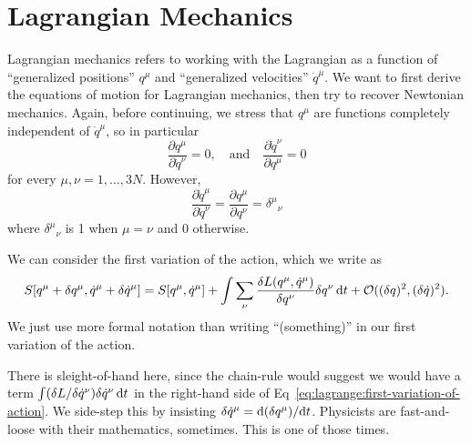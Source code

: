 \section{Lagrangian Mechanics}

\M
Lagrangian mechanics refers to working with the Lagrangian as a function
of ``generalized positions'' $q^{\mu}$ and ``generalized velocities'' $\dot{q}^{\mu}$.
We want to first derive the equations of motion for Lagrangian
mechanics, then try to recover Newtonian mechanics. Again, before
continuing, we stress that $q^{\mu}$ are functions completely
independent of $\dot{q}^{\mu}$, so in particular
\begin{equation}
\frac{\partial q^{\mu}}{\partial\dot{q}^{\nu}}=0,\quad\mbox{and}\quad
\frac{\partial\dot{q}^{\nu}}{\partial q^{\mu}}=0
\end{equation}
for every $\mu,\nu=1,\dots,3N$. However,
\begin{equation}
\frac{\partial\dot{q}^{\mu}}{\partial\dot{q}^{\nu}}=
\frac{\partial q^{\mu}}{\partial q^{\nu}}={\delta^{\mu}}_{\nu}
\end{equation}
where ${\delta^{\mu}}_{\nu}$ is 1 when $\mu=\nu$ and 0 otherwise.

We can consider the first variation of the action, which we write as
\begin{equation}\label{eq:lagrange:first-variation-of-action}
  S[q^{\mu} + \delta q^{\mu}, \dot{q}^{\mu} + \delta\dot{q}^{\mu}]
  =
  S[q^{\mu}, \dot{q}^{\mu}] + \int\sum_{\nu}\frac{\delta L(q^{\mu},
    \dot{q}^{\mu})}{\delta q^{\nu}}\delta q^{\nu}\,\mathrm{d} t +
  \mathcal{O}((\delta q)^{2},(\delta\dot{q})^{2}).
\end{equation}
We just use more formal notation than writing ``(something)'' in our
first variation of the action.

\begin{ddanger}
There is sleight-of-hand here, since the chain-rule would suggest we
would have a term $\int (\delta L/\delta\dot{q}^{\nu})\delta\dot{q}^{\nu}\,\mathrm{d} t$
in the right-hand side of Eq~\eqref{eq:lagrange:first-variation-of-action}.
We side-step this by insisting $\delta\dot{q}^{\mu}=\mathrm{d}(\delta q^{\mu})/\mathrm{d} t$.
Physicists are fast-and-loose with their mathematics, sometimes. This is
one of those times.
\end{ddanger}

